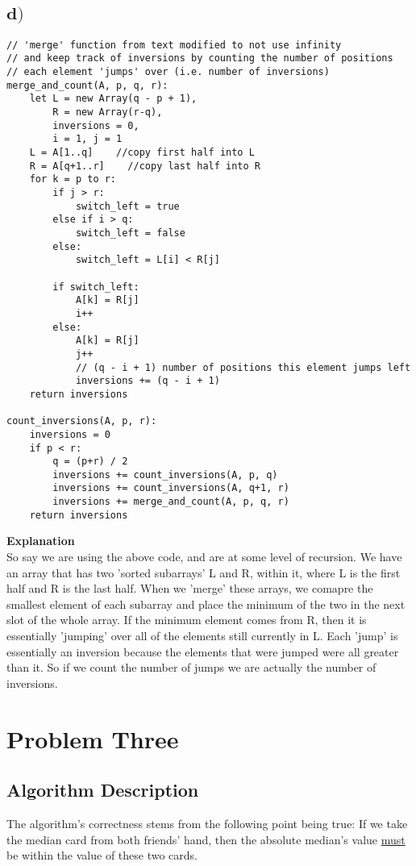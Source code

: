 \documentclass[a4paper,12pt]{article}
\begin{document}
\subsection*{\(\mathbf d)\)}
\begin{lstlisting}
// 'merge' function from text modified to not use infinity
// and keep track of inversions by counting the number of positions
// each element 'jumps' over (i.e. number of inversions)
merge_and_count(A, p, q, r):
    let L = new Array(q - p + 1),
        R = new Array(r-q),
        inversions = 0,
        i = 1, j = 1
    L = A[1..q]    //copy first half into L
    R = A[q+1..r]    //copy last half into R
    for k = p to r:
        if j > r:
            switch_left = true
        else if i > q:
            switch_left = false
        else:
            switch_left = L[i] < R[j]

        if switch_left:
            A[k] = R[j]
            i++
        else:
            A[k] = R[j]
            j++
            // (q - i + 1) number of positions this element jumps left 
            inversions += (q - i + 1)
    return inversions

count_inversions(A, p, r):
    inversions = 0
    if p < r:
        q = (p+r) / 2
        inversions += count_inversions(A, p, q)
        inversions += count_inversions(A, q+1, r)
        inversions += merge_and_count(A, p, q, r)
    return inversions
  \end{lstlisting}
  {\bf Explanation}\\
  So say we are using the above code, and are at some level of
  recursion. We have an array that has two 'sorted subarrays' L and R,
  within it, where L is the first half and R is the last half. When we
  'merge' these arrays, we comapre the smallest element of each
  subarray and place the minimum of the two in the next slot of the
  whole array. If the minimum element comes from R, then it is
  essentially 'jumping' over all of the elements still currently in
  L. Each 'jump' is essentially an inversion because the elements that
  were jumped were all greater than it. So if we count the number of
  jumps we are actually the number of inversions.
\section{Problem Three}
\subsection*{Algorithm Description}
The algorithm's correctness stems from the following point being true:
If we take the median card from both friends'
hand, then the absolute median's value \underline{must} be within the value of these two cards.\\
\end{document}
